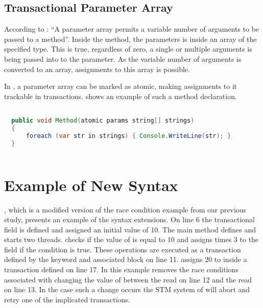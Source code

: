 \subsection{Transactional Parameter Array}
According to \cite[p. 17]{csharp2013specificaiton}: ``A parameter array permits a variable number of arguments to be passed to a method''. Inside the method, the parameters is inside an array of the specified type. This is true, regardless of zero, a single or multiple arguments is being passed into to the parameter. As the variable number of arguments is converted to an array, assignments to this array is possible. 

In \stmnamesp, a parameter array can be marked as atomic, making assignments to it trackable in transactions.  shows an example of such a method declaration.

\begin{lstlisting}[label=lst:design_param_array,
  caption={Transactional Parameter Array},
  language=Java,  
  showspaces=false,
  showtabs=false,
  breaklines=true,
  showstringspaces=false,
  breakatwhitespace=true,
  commentstyle=\color{greencomments},
  keywordstyle=\color{bluekeywords},
  stringstyle=\color{redstrings},
  morekeywords={atomic, retry, orElse, var, get, set, params, string, in, foreach}]  % Start your code-block

  public void Method(atomic params string[] strings)
  {
      foreach (var str in strings) { Console.WriteLine(str); }
  }
    
\end{lstlisting}
\section{Example of New Syntax}\label{sec:example_design}
, which is a modified version of the race condition example from our previous study\cite[p. 23]{dpt907e14trending}, presents an example of the syntax extensions. On line 6 the transactional field  is defined and assigned an initial value of 10. The main method defines and starts two threads.  checks if the value of  is equal to 10 and assigns  times 3 to the field if the condition is true. These operations are executed as a transaction defined by the  keyword and associated block on line 11.  assigns 20 to  inside a transaction defined on line 17. In this example \stmnamesp removes the race conditions associated with  changing the value of  between the read on line 12 and the read on line 13. In the case such a change occurs the \ac{STM} system of \stmnamesp will abort and retry one of the implicated transactions.
 
